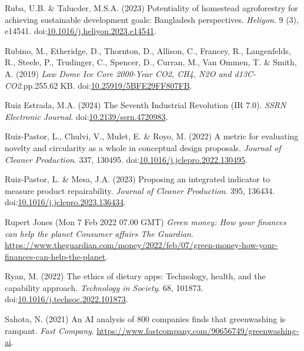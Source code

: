 \documentclass[
  letterpaper,
  DIV=11,
  numbers=noendperiod]{scrartcl}
\newlength{\cslhangindent}
\newenvironment{CSLReferences}[2] %
 {\begin{list}{}{%
  \setlength{\itemindent}{0pt}
  \setlength{\leftmargin}{0pt}
  \setlength{\parsep}{0pt}
  \ifodd #1
   \setlength{\leftmargin}{\cslhangindent}
   \setlength{\itemindent}{-1\cslhangindent}
  \fi
  \setlength{\itemsep}{#2\baselineskip}}}
 {\end{list}}
\begin{document}
\begin{CSLReferences}{0}{1}
Ruba, U.B. \& Talucder, M.S.A. (2023) Potentiality of homestead
agroforestry for achieving sustainable development goals: {Bangladesh}
perspectives. \emph{Heliyon}. 9 (3), e14541.
doi:\href{https://doi.org/10.1016/j.heliyon.2023.e14541}{10.1016/j.heliyon.2023.e14541}.

Rubino, M., Etheridge, D., Thornton, D., Allison, C., Francey, R.,
Langenfelds, R., Steele, P., Trudinger, C., Spencer, D., Curran, M., Van
Ommen, T. \& Smith, A. (2019) \emph{Law {Dome Ice Core} 2000-{Year CO2},
{CH4}, {N2O} and {d13C-CO2}}.pp.255.62 KB.
doi:\href{https://doi.org/10.25919/5BFE29FF807FB}{10.25919/5BFE29FF807FB}.

Ruiz Estrada, M.A. (2024) The {Seventh Industrial Revolution} ({IR}
7.0). \emph{SSRN Electronic Journal}.
doi:\href{https://doi.org/10.2139/ssrn.4720983}{10.2139/ssrn.4720983}.

Ruiz-Pastor, L., Chulvi, V., Mulet, E. \& Royo, M. (2022) A metric for
evaluating novelty and circularity as a whole in conceptual design
proposals. \emph{Journal of Cleaner Production}. 337, 130495.
doi:\href{https://doi.org/10.1016/j.jclepro.2022.130495}{10.1016/j.jclepro.2022.130495}.

Ruiz-Pastor, L. \& Mesa, J.A. (2023) Proposing an integrated indicator
to measure product repairability. \emph{Journal of Cleaner Production}.
395, 136434.
doi:\href{https://doi.org/10.1016/j.jclepro.2023.136434}{10.1016/j.jclepro.2023.136434}.

Rupert Jones (Mon 7 Feb 2022 07.00 GMT) \emph{Green money: How your
finances can help the planet {\textbar} {Consumer} affairs {\textbar}
{The Guardian}}.
\url{https://www.theguardian.com/money/2022/feb/07/green-money-how-your-finances-can-help-the-planet}.

Ryan, M. (2022) The ethics of dietary apps: {Technology}, health, and
the capability approach. \emph{Technology in Society}. 68, 101873.
doi:\href{https://doi.org/10.1016/j.techsoc.2022.101873}{10.1016/j.techsoc.2022.101873}.

Sahota, N. (2021) An {AI} analysis of 800 companies finds that
greenwashing is rampant. \emph{Fast Company}.
\url{https://www.fastcompany.com/90656749/greenwashing-ai}.


\end{CSLReferences}
\end{document}
